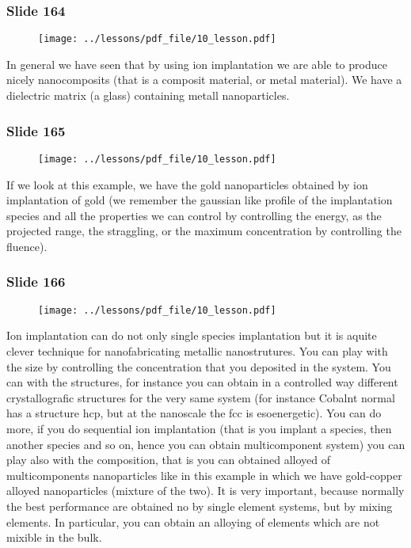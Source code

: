 \documentclass[../main/main.tex]{subfiles}
\begin{document}
\newpage

\subsubsection{Slide 164}

\begin{figure}[h!]
\centering
\texttt{[image: ../lessons/pdf\_file/10\_lesson.pdf]}
\end{figure}

In general we have seen that by using ion implantation we are able to produce nicely nanocomposits (that is a composit material, or metal material).
We have a dielectric matrix (a glass) containing metall nanoparticles.

\newpage

\subsubsection{Slide 165}

\begin{figure}[h!]
\centering
\texttt{[image: ../lessons/pdf\_file/10\_lesson.pdf]}
\end{figure}

If we look at this example, we have the gold nanoparticles obtained by ion implantation of gold (we remember the gaussian like profile of the implantation species and all the properties we can control by controlling the energy, as the projected range, the straggling, or the maximum concentration by controlling the fluence).

\newpage

\subsubsection{Slide 166}

\begin{figure}[h!]
\centering
\texttt{[image: ../lessons/pdf\_file/10\_lesson.pdf]}
\end{figure}

Ion implantation can do not only single species implantation but it is aquite clever technique for nanofabricating metallic nanostrutures. You can play with the size by controlling the concentration that you deposited in the system. You can with the structures, for instance you can obtain in a controlled way different crystallografic structures for the very same system (for instance Cobalnt normal has a structure hcp, but at the nanoscale the fcc is esoenergetic). You can do more, if you do sequential ion implantation (that is you implant a species, then another species and so on, hence you can obtain multicomponent system) you can play also with the composition, that is you can obtained alloyed of multicomponents nanoparticles like in this example in which we have gold-copper alloyed nanoparticles (mixture of the two).
It is very important, because normally the best performance are obtained no by single element systems, but by mixing elements.
In particular, you can obtain an alloying of elements which are not mixible in the bulk.
\end{document}
